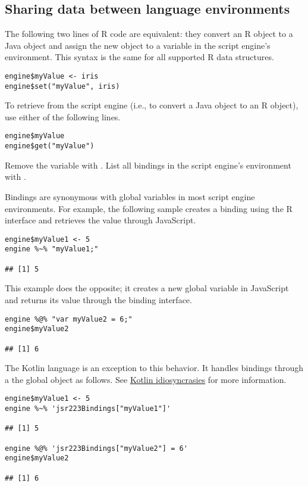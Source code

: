 \subsection{Sharing data between language environments}

The following two lines of R code are equivalent: they convert an R object to a Java object and assign the new object to a variable  in the script engine's environment. This syntax is the same for all supported R data structures.

\begin{verbatim}
engine$myValue <- iris
engine$set("myValue", iris)
\end{verbatim}

To retrieve  from the script engine (i.e., to convert a Java object to an R object), use either of the following lines.

\begin{verbatim}
engine$myValue
engine$get("myValue")
\end{verbatim}

Remove the  variable with . List all bindings in the script engine's environment with .

Bindings are synonymous with global variables in most script engine environments. For example, the following sample creates a binding using the R interface and retrieves the value through JavaScript.

\begin{verbatim}
engine$myValue1 <- 5
engine %~% "myValue1;"

## [1] 5
\end{verbatim}
This example does the opposite; it creates a new global variable in JavaScript and returns its value through the  binding interface.
\begin{verbatim}
engine %@% "var myValue2 = 6;"
engine$myValue2

## [1] 6
\end{verbatim}
The Kotlin language is an exception to this behavior. It handles bindings through a the global object  as follows. See \hyperlink{kotlinidiosyncrasies}{Kotlin idiosyncrasies} for more information.

\begin{verbatim}
engine$myValue1 <- 5
engine %~% 'jsr223Bindings["myValue1"]'

## [1] 5

engine %@% 'jsr223Bindings["myValue2"] = 6'
engine$myValue2

## [1] 6
\end{verbatim}

